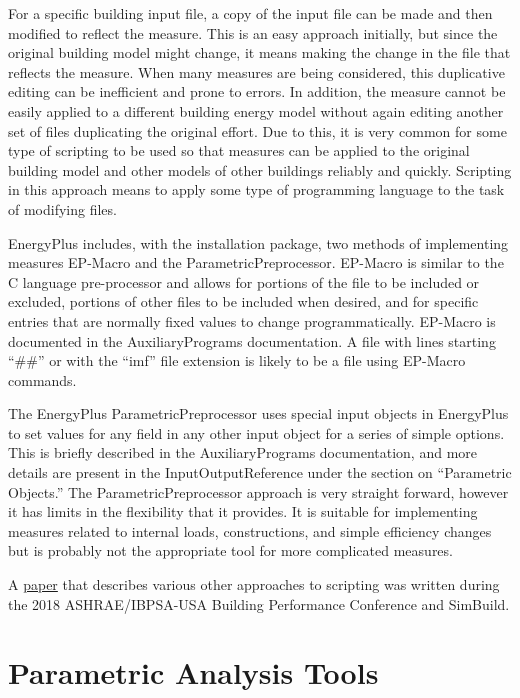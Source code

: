 For a specific building input file, a copy of the input file can be
made and then modified to reflect the measure. This is an easy approach
initially, but since the original building model might change, it
means making the change in the file that reflects the measure. When
many measures are being considered, this duplicative editing can be
inefficient and prone to errors. In addition, the measure cannot be
easily applied to a different building energy model without again
editing another set of files duplicating the original effort. Due
to this, it is very common for some type of scripting to be used so
that measures can be applied to the original building model and other
models of other buildings reliably and quickly. Scripting in this
approach means to apply some type of programming language to the task
of modifying files.

EnergyPlus includes, with the installation package, two methods of
implementing measures EP-Macro and the ParametricPreprocessor. EP-Macro
is similar to the C language pre-processor and allows for portions
of the file to be included or excluded, portions of other files to
be included when desired, and for specific entries that are normally
fixed values to change programmatically. EP-Macro is documented in
the AuxiliaryPrograms documentation. A file with lines starting ``\#\#''
or with the ``imf'' file extension is likely to be a file using
EP-Macro commands. 

The EnergyPlus ParametricPreprocessor uses special input objects in
EnergyPlus to set values for any field in any other input object for
a series of simple options. This is briefly described in the AuxiliaryPrograms
documentation, and more details are present in the InputOutputReference
under the section on ``Parametric Objects.'' The ParametricPreprocessor
approach is very straight forward, however it has limits in the flexibility
that it provides. It is suitable for implementing measures related
to internal loads, constructions, and simple efficiency changes but
is probably not the appropriate tool for more complicated measures.

A \href{https://www.ashrae.org/File\%20Library/Conferences/Specialty\%20Conferences/2018\%20Building\%20Performance\%20Analysis\%20Conference\%20and\%20SimBuild/Papers/C043.pdf}{paper}
that describes various other approaches to scripting was written during
the 2018 ASHRAE/IBPSA-USA Building Performance Conference and SimBuild.

\section{Parametric Analysis Tools }

